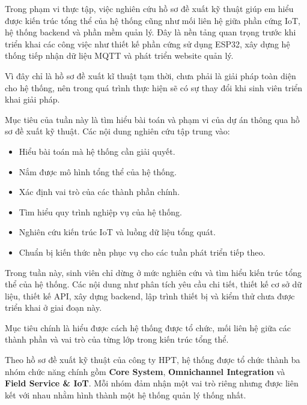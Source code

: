 Trong phạm vi thực tập, việc nghiên cứu hồ sơ đề xuất kỹ thuật giúp em hiểu được kiến trúc tổng thể của hệ thống cũng như mối liên hệ giữa phần cứng IoT, hệ thống backend và phần mềm quản lý. Đây là nền tảng quan trọng trước khi triển khai các công việc như thiết kế phần cứng sử dụng ESP32, xây dựng hệ thống tiếp nhận dữ liệu MQTT và phát triển website quản lý.

Vì đây chỉ là hồ sơ đề xuất kĩ thuật tạm thời, chưa phải là giải pháp toàn diện cho hệ thống, nên trong quá trình thực hiện sẽ có sự thay đổi khi sinh viên triển khai giải pháp.



Mục tiêu của tuần này là tìm hiểu bài toán và phạm vi của dự án thông qua hồ sơ đề xuất kỹ thuật. Các nội dung nghiên cứu tập trung vào:

\begin{itemize}
    \item Hiểu bài toán mà hệ thống cần giải quyết.
    \item Nắm được mô hình tổng thể của hệ thống.
    \item Xác định vai trò của các thành phần chính.
    \item Tìm hiểu quy trình nghiệp vụ của hệ thống.
    \item Nghiên cứu kiến trúc IoT và luồng dữ liệu tổng quát.
    \item Chuẩn bị kiến thức nền phục vụ cho các tuần phát triển tiếp theo.
\end{itemize}


Trong tuần này, sinh viên chỉ dừng ở mức nghiên cứu và tìm hiểu kiến trúc tổng thể của hệ thống. Các nội dung như phân tích yêu cầu chi tiết, thiết kế cơ sở dữ liệu, thiết kế API, xây dựng backend, lập trình thiết bị và kiểm thử chưa được triển khai ở giai đoạn này.

Mục tiêu chính là hiểu được cách hệ thống được tổ chức, mối liên hệ giữa các thành phần và vai trò của từng lớp trong kiến trúc tổng thể.



Theo hồ sơ đề xuất kỹ thuật của công ty HPT, hệ thống được tổ chức thành ba nhóm chức năng chính gồm \textbf{Core System}, \textbf{Omnichannel Integration} và \textbf{Field Service \& IoT}. Mỗi nhóm đảm nhận một vai trò riêng nhưng được liên kết với nhau nhằm hình thành một hệ thống quản lý thống nhất.

